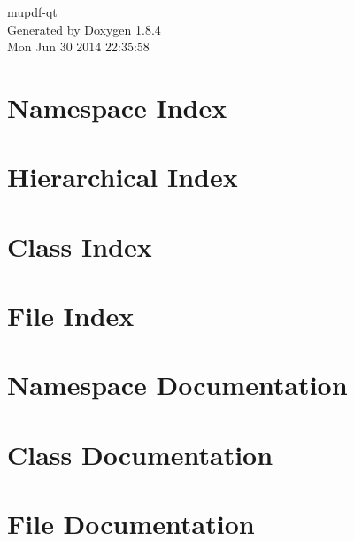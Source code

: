 \documentclass[twoside]{book}
\newcommand{\clearemptydoublepage}{%
  \newpage{\pagestyle{empty}\cleardoublepage}%
}
\begin{document}
\hypersetup{pageanchor=false}
\begin{titlepage}
\vspace*{7cm}
\begin{center}%
{\Large mupdf-\/qt }\\
\vspace*{1cm}
{\large Generated by Doxygen 1.8.4}\\
\vspace*{0.5cm}
{\small Mon Jun 30 2014 22:35:58}\\
\end{center}
\end{titlepage}
\clearemptydoublepage
\tableofcontents
\clearemptydoublepage
{}
\hypersetup{pageanchor=true}

\chapter{Namespace Index}

\chapter{Hierarchical Index}

\chapter{Class Index}

\chapter{File Index}

\chapter{Namespace Documentation}

\chapter{Class Documentation}











\chapter{File Documentation}












\newpage
{}
{}
\printindex
\end{document}
